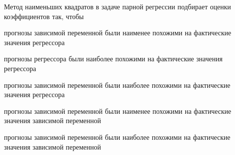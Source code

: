 
\begin{question}
Метод наименьших квадратов в задаче парной регрессии подбирает оценки коэффициентов так, чтобы
\begin{answerlist}
  \item прогнозы зависимой переменной были наименее похожими на фактические значения регрессора
  \item прогнозы регрессора были наиболее похожими на фактические значения регрессора
  \item прогнозы зависимой переменной были наиболее похожими на фактические значения регрессора
  \item прогнозы зависимой переменной были наименее похожими на фактические значения зависимой переменной
  \item прогнозы зависимой переменной были наиболее похожими на фактические значения зависимой переменной
\end{answerlist}
\end{question}


